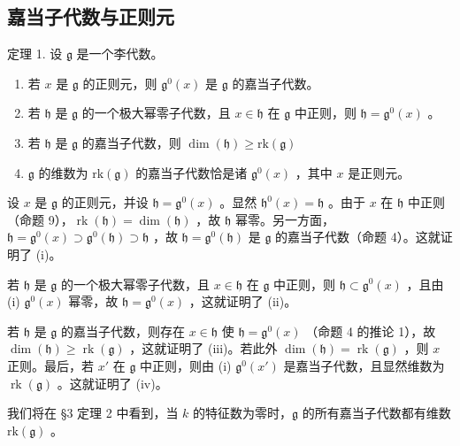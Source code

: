 \subsection{嘉当子代数与正则元}

定理 1. 设 \(\mathfrak{g}\) 是一个李代数。

\begin{enumerate}
\def\labelenumi{(\roman{enumi})}
\item
  若 \(x\) 是 \(\mathfrak{g}\) 的正则元，则 \(\mathfrak{g}^0(x)\) 是 \(\mathfrak{g}\) 的嘉当子代数。
\item
  若 \(\mathfrak{h}\) 是 \(\mathfrak{g}\) 的一个极大幂零子代数，且 \(x \in \mathfrak{h}\) 在 \(\mathfrak{g}\) 中正则，则 \(\mathfrak{h} = \mathfrak{g}^0(x)\) 。
\item
  若 \(\mathfrak{h}\) 是 \(\mathfrak{g}\) 的嘉当子代数，则 \(\dim (\mathfrak{h})\geq \mathrm{rk}(\mathfrak{g})\)
\item
  \(\mathfrak{g}\) 的维数为 \(\mathrm{rk}(\mathfrak{g})\) 的嘉当子代数恰是诸 \(\mathfrak{g}^0 (x)\) ，其中 \(x\) 是正则元。
\end{enumerate}

设 \(x\) 是 \(\mathfrak{g}\) 的正则元，并设 \(\mathfrak{h} = \mathfrak{g}^0(x)\) 。显然 \(\mathfrak{h}^0(x) = \mathfrak{h}\) 。由于 \(x\) 在 \(\mathfrak{h}\) 中正则（命题 9），\(\operatorname{rk}(\mathfrak{h}) = \dim(\mathfrak{h})\) ，故 \(\mathfrak{h}\) 幂零。另一方面，\(\mathfrak{h} = \mathfrak{g}^0(x) \supset \mathfrak{g}^0(\mathfrak{h}) \supset \mathfrak{h}\) ，故 \(\mathfrak{h} = \mathfrak{g}^0(\mathfrak{h})\) 是 \(\mathfrak{g}\) 的嘉当子代数（命题 4）。这就证明了 (i)。

若 \(\mathfrak{h}\) 是 \(\mathfrak{g}\) 的一个极大幂零子代数，且 \(x\in \mathfrak{h}\) 在 \(\mathfrak{g}\) 中正则，则 \(\mathfrak{h}\subset \mathfrak{g}^0 (x)\) ，且由 (i) \(\mathfrak{g}^0 (x)\) 幂零，故 \(\mathfrak{h} = \mathfrak{g}^0 (x)\) ，这就证明了 (ii)。

若 \(\mathfrak{h}\) 是 \(\mathfrak{g}\) 的嘉当子代数，则存在 \(x \in \mathfrak{h}\) 使 \(\mathfrak{h} = \mathfrak{g}^0(x)\) （命题 4 的推论 1），故 \(\dim(\mathfrak{h}) \geq \operatorname{rk}(\mathfrak{g})\) ，这就证明了 (iii)。若此外 \(\dim(\mathfrak{h}) = \operatorname{rk}(\mathfrak{g})\) ，则 \(x\) 正则。最后，若 \(x'\) 在 \(\mathfrak{g}\) 中正则，则由 (i) \(\mathfrak{g}^0(x')\) 是嘉当子代数，且显然维数为 \(\operatorname{rk}(\mathfrak{g})\) 。这就证明了 (iv)。

我们将在 §3 定理 2 中看到，当 \(k\) 的特征数为零时，\(\mathfrak{g}\) 的所有嘉当子代数都有维数 \(\mathrm{rk}(\mathfrak{g})\) 。


